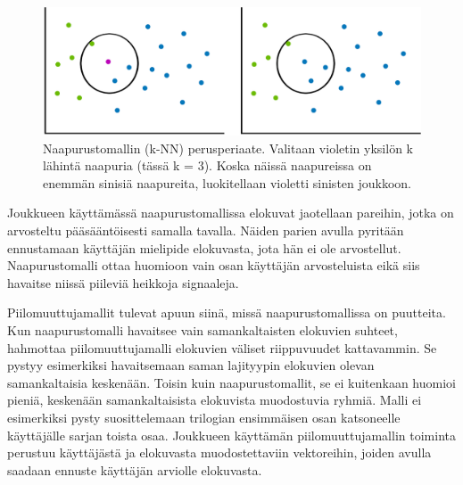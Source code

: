 \documentclass[12pt,finnish]{tktltiki2}
\theoremstyle{definition}
\theoremstyle{remark}
\begin{document}
\begin{figure}[]
\includegraphics[width = 370pt]{knnkumpikin.eps}\caption{Naapurustomallin (k-NN) perusperiaate. Valitaan violetin yksilön k lähintä naapuria (tässä k = 3). Koska näissä naapureissa on enemmän sinisiä naapureita, luokitellaan violetti sinisten joukkoon.}
\label{knn}
\end{figure} 
 
Joukkueen käyttämässä naapurustomallissa elokuvat jaotellaan pareihin, jotka on arvosteltu pääsääntöisesti samalla tavalla. Näiden parien avulla pyritään ennustamaan käyttäjän mielipide elokuvasta, jota hän ei ole arvostellut. Naapurustomalli ottaa huomioon vain osan käyttäjän arvosteluista eikä siis havaitse niissä piileviä heikkoja signaaleja. 

	Piilomuuttujamallit tulevat apuun siinä, missä naapurustomallissa on puutteita. Kun naapurustomalli havaitsee vain samankaltaisten elokuvien suhteet, hahmottaa piilomuuttujamalli elokuvien väliset riippuvuudet kattavammin. Se pystyy esimerkiksi havaitsemaan saman lajityypin elokuvien olevan samankaltaisia keskenään. Toisin kuin naapurustomallit, se ei kuitenkaan huomioi pieniä, keskenään samankaltaisista elokuvista muodostuvia ryhmiä. Malli ei esimerkiksi pysty suosittelemaan trilogian ensimmäisen osan katsoneelle käyttäjälle sarjan toista osaa. Joukkueen käyttämän piilomuuttujamallin toiminta perustuu käyttäjästä ja elokuvasta muodostettaviin vektoreihin, joiden avulla saadaan ennuste käyttäjän arviolle elokuvasta.
        
\end{document}
